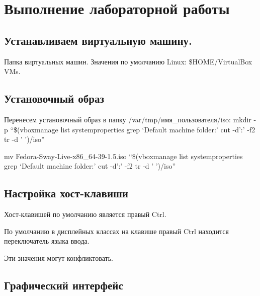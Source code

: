 \documentclass[
  russian,
  letterpaper,
  DIV=11,
  numbers=noendperiod]{scrartcl}
\begin{document}
\section{Выполнение лабораторной
работы}\label{ux432ux44bux43fux43eux43bux43dux435ux43dux438ux435-ux43bux430ux431ux43eux440ux430ux442ux43eux440ux43dux43eux439-ux440ux430ux431ux43eux442ux44b}

\subsection{Устанавливаем виртуальную
машину.}\label{ux443ux441ux442ux430ux43dux430ux432ux43bux438ux432ux430ux435ux43c-ux432ux438ux440ux442ux443ux430ux43bux44cux43dux443ux44e-ux43cux430ux448ux438ux43dux443.}

Папка виртуальных машин. Значения по умолчанию Linux: \$HOME/VirtualBox
VMs.

\subsection{Установочный
образ}\label{ux443ux441ux442ux430ux43dux43eux432ux43eux447ux43dux44bux439-ux43eux431ux440ux430ux437}

Перенесем установочный образ в папку /var/tmp/имя\_пользователя/iso:
mkdir -p ``\$(vboxmanage list systemproperties \textbar{} grep `Default
machine folder:' \textbar{} cut -d':' -f2 \textbar{} tr -d ' ')/iso''

mv Fedora-Sway-Live-x86\_64-39-1.5.iso ``\$(vboxmanage list
systemproperties \textbar{} grep `Default machine folder:' \textbar{}
cut -d':' -f2 \textbar{} tr -d ' ')/iso''

\subsection{Настройка
хост-клавиши}\label{ux43dux430ux441ux442ux440ux43eux439ux43aux430-ux445ux43eux441ux442-ux43aux43bux430ux432ux438ux448ux438}

Хост-клавишей по умолчанию является правый Ctrl.

По умолчанию в дисплейных классах на клавише правый Ctrl находится
переключатель языка ввода.

Эти значения могут конфликтовать.

\subsection{Графический
интерфейс}\label{ux433ux440ux430ux444ux438ux447ux435ux441ux43aux438ux439-ux438ux43dux442ux435ux440ux444ux435ux439ux441}
\end{document}
